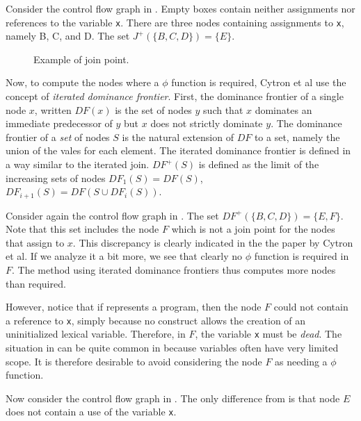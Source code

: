 Consider the control flow graph in .  Empty
boxes contain neither assignments nor references to the variable
\texttt{x}.  There are three nodes containing assignments to
\texttt{x}, namely B, C, and D.  The set $J^+(\{B, C, D\}) = \{E\}$.

\begin{figure}
\begin{center}
\end{center}
\caption{\label{fig-ssa-join-1}
Example of join point.}
\end{figure}

Now, to compute the nodes where a $\phi$ function is required, Cytron
et al use the concept of \emph{iterated dominance frontier}.  First,
the dominance frontier of a single node $x$, written $DF(x)$ is the
set of nodes $y$ such that $x$ dominates an immediate predecessor of
$y$ but $x$ does not strictly dominate $y$.  The dominance frontier of
a \emph{set} of nodes $S$ is the natural extension of $DF$ to a set,
namely the union of the vales for each element.  The iterated
dominance frontier is defined in a way similar to the iterated join. 
$DF^+(S)$ is defined as the limit of the
increasing sets of nodes $DF_1(S) = DF(S)$, $DF_{i+1}(S) = DF(S \cup
DF_i(S))$.

Consider again the control flow graph in .  The
set $DF^+(\{B, C, D\}) = \{E, F\}$.  Note that this set includes the
node $F$ which is not a join point for the nodes that assign to $x$.
This discrepancy is clearly indicated in the the paper by Cytron et
al.  If we analyze it a bit more, we see that clearly no $\phi$
function is required in $F$.  The method using iterated dominance
frontiers thus computes more nodes than required.  

However, notice that if  represents a
\commonlisp{} program, then the node $F$ could not contain a reference
to \texttt{x}, simply because no \commonlisp{} construct allows the
creation of an uninitialized lexical variable.  Therefore, in $F$, the
variable \texttt{x} must be \emph{dead}.  The situation in
 can be quite common in \commonlisp{} because
variables often have very limited scope.  It is therefore desirable to
avoid considering the node $F$ as needing a $\phi$ function.

Now consider the control flow graph in .  The
only difference from  is that node $E$ does not
contain a use of the variable \texttt{x}.

